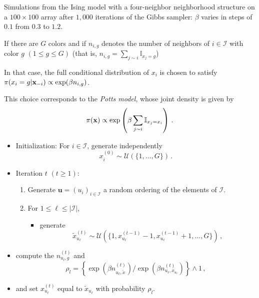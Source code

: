 \begin{slide}
\footnotesize Simulations from the Ising model with
a four-neighbor neighborhood structure on a $100\times 100$ array after
$1,000$ iterations of the Gibbs sampler: $\beta$ varies in steps of
$0.1$ from $0.3$ to $1.2$.

\end{slide}\begin{slide}

If there are $G$ colors and if $n_{i,g}$ denotes the number of neighbors of $i\in\mathcal{I}$ with color $g$
$(1\le g\le G)$ (that is, $n_{i,g}=\sum_{j\sim
i}\mathbb{I}_{x_j=g}$)

In that case, the full conditional distribution of $x_i$ is
chosen to satisfy $\pi(x_i=g|\mathbf{x}_{-i})\propto \exp(\beta n_{i,g})$.

This choice corresponds to the {\em Potts model}, whose joint
density is given by
$$
\pi(\mathbf{x})\propto \exp\left(\beta \sum_{j\sim i} \mathbb{I}_{x_j=x_i}\right)\,.
$$

\end{slide}\begin{slide}

\begin{algo}
\begin{itemize}
\item[] Initialization: For $i\in\mathcal{I}$, generate independently
$$
x_i^{(0)}\sim\mathscr{U}(\{1,\ldots,G\})\,.
$$
\item[] Iteration $t$ $(t\ge 1)$:
\begin{enumerate}
\item Generate $\mathbf{u}=(u_i)_{i\in\mathcal{I}}$ a random ordering of the elements of $\mathcal{I}$.
\item For $1\le\ell\le|\mathcal{I}|$,
\begin{itemize}
\item[] generate
$$
\tilde x_{u_\ell}^{(t)}\sim\mathscr{U}(\{1,x_{u_\ell}^{(t-1)}-1,x_{u_\ell}^{(t-1)}+1,\ldots,G\})\,,
$$
\end{itemize}
\end{enumerate}
\end{itemize}
\end{algo}

\end{slide}\begin{slide}

\begin{algo}[continued]
\begin{itemize}
\item[] compute the $n_{u_l,g}^{(t)}$ and
$$
\rho_l=\left\{ \exp(\beta n_{u_\ell,\tilde x}^{(t)})/\exp(\beta n_{u_\ell,x_{u_\ell}}^{(t)})\right\} \wedge 1\,,
$$
\item[] and set $x_{u_\ell}^{(t)}$ equal to $\tilde x_{u_\ell}$ with probability $\rho_l$.
\end{itemize}
\end{algo}


\end{slide}
